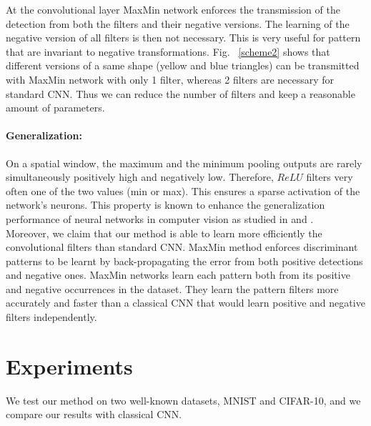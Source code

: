\documentclass{article}
\begin{document}
At the convolutional layer MaxMin network enforces the transmission of the detection from both the filters and their negative versions. The learning of the negative version of all filters is then not necessary. This is very useful for pattern that are invariant to negative transformations. Fig.~ \ref{scheme2} shows that different versions of a same shape (yellow and blue triangles) can be transmitted with MaxMin network with only 1 filter, whereas 2 filters are necessary for standard CNN. Thus we can reduce the number of filters and keep a reasonable amount of parameters.
\vspace*{-0.6cm}\paragraph*{Generalization:}
On a spatial window, the maximum and the minimum pooling outputs are rarely simultaneously positively high and negatively low. Therefore, $ReLU$ filters very often one of the two values (min or max). This ensures a sparse activation of the network's neurons. This property is known to enhance the generalization performance of neural networks in computer vision as studied in \cite{sparse} and \cite{dropout}. \\
Moreover, we claim that our method is able to learn more efficiently the convolutional filters than standard CNN. MaxMin method enforces discriminant patterns to be learnt by back-propagating the error from both positive detections and negative ones. MaxMin networks learn each pattern both from its positive and negative occurrences in the dataset. They learn the pattern filters more accurately and faster than a classical CNN that would learn positive and negative filters independently. 

\section{Experiments}
\label{sec:typestyle}
We test our method on two well-known datasets, MNIST and CIFAR-10, and we compare our results with classical CNN. 
\end{document}
